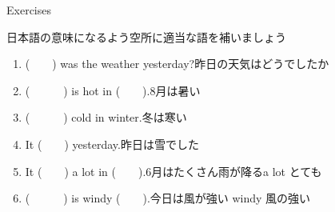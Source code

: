 \documentclass[aspectratio=169,xcolor={dvipsnames,table}]{beamer}
\begin{document}
\begin{frame}[plain]{Exercises}

日本語の意味になるよう空所に適当な語を補いましょう%
\hfill{\scriptsize {}}

\begin{enumerate}
 \item (~~~~) was the weather yesterday?\hspace{2\zw}昨日の天気はどうでしたか
 \item (~~~~~~) is hot in (~~~~).\hspace{2\zw}8月は暑い
 \item (~~~~~~) cold in winter.\hspace{2\zw}冬は寒い
 \item It (~~~~) yesterday.\hspace{2\zw}昨日は雪でした
 \item It (~~~~) a lot in  (~~~~).\hspace{2\zw}6月はたくさん雨が降る\hfill{\scriptsize a lot } とても
 \item (~~~~~~) is windy  (~~~~).\hspace{2\zw}今日は風が強い%
\hfill{\scriptsize windy  風の強い}
\end{enumerate}
\end{frame}
\end{document}

